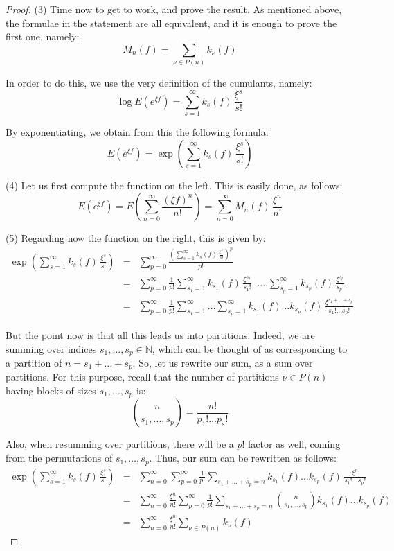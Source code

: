 \documentclass[12pt]{amsbook}
\begin{document}
\begin{proof}
(3) Time now to get to work, and prove the result. As mentioned above, the formulae in the statement are all equivalent, and it is enough to prove the first one, namely:
$$M_n(f)=\sum_{\nu\in P(n)}k_\nu(f)$$

In order to do this, we use the very definition of the cumulants, namely:
$$\log E(e^{\xi f})=\sum_{s=1}^\infty k_s(f)\,\frac{\xi^s}{s!}$$

By exponentiating, we obtain from this the following formula:
$$E(e^{\xi f})=\exp\left(\sum_{s=1}^\infty k_s(f)\,\frac{\xi^s}{s!}\right)$$

(4) Let us first compute the function on the left. This is easily done, as follows:
$$E(e^{\xi f})
=E\left(\sum_{n=0}^\infty\frac{(\xi f)^n}{n!}\right)
=\sum_{n=0}^\infty M_n(f)\,\frac{\xi^n}{n!}$$

(5) Regarding now the function on the right, this is given by:
\begin{eqnarray*}
\exp\left(\sum_{s=1}^\infty k_s(f)\,\frac{\xi^s}{s!}\right)
&=&\sum_{p=0}^\infty\frac{\left(\sum_{s=1}^\infty k_s(f)\,\frac{\xi^s}{s!}\right)^p}{p!}\\
&=&\sum_{p=0}^\infty\frac{1}{p!}\sum_{s_1=1}^\infty k_{s_1}(f)\,\frac{\xi^{s_1}}{s_1!}\ldots\ldots\sum_{s_p=1}^\infty k_{s_p}(f)\,\frac{\xi^{s_p}}{s_p!}\\
&=&\sum_{p=0}^\infty\frac{1}{p!}\sum_{s_1=1}^\infty\ldots\sum_{s_p=1}^\infty k_{s_1}(f)\ldots k_{s_p}(f)\,\frac{\xi^{s_1+\ldots+s_p}}{s_1!\ldots s_p!}
\end{eqnarray*}

But the point now is that all this leads us into partitions. Indeed, we are summing over indices $s_1,\ldots,s_p\in\mathbb N$, which can be thought of as corresponding to a partition of $n=s_1+\ldots+s_p$. So, let us rewrite our sum, as a sum over partitions. For this purpose, recall that the number of partitions $\nu\in P(n)$ having blocks of sizes $s_1,\ldots,s_p$ is:
$$\binom{n}{s_1,\ldots,s_p}=\frac{n!}{p_1!\ldots p_s!}$$

Also, when resumming over partitions, there will be a $p!$ factor as well, coming from the permutations of $s_1,\ldots,s_p$. Thus, our sum can be rewritten as follows:
\begin{eqnarray*}
\exp\left(\sum_{s=1}^\infty k_s(f)\,\frac{\xi^s}{s!}\right)
&=&\sum_{n=0}^\infty\sum_{p=0}^\infty\frac{1}{p!}\sum_{s_1+\ldots+s_p=n}k_{s_1}(f)\ldots k_{s_p}(f)\,\frac{\xi^n}{s_1!\ldots s_p!}\\
&=&\sum_{n=0}^\infty\frac{\xi^n}{n!}\sum_{p=0}^\infty\frac{1}{p!}\sum_{s_1+\ldots+s_p=n}\binom{n}{s_1,\ldots,s_p}k_{s_1}(f)\ldots k_{s_p}(f)\\
&=&\sum_{n=0}^\infty\frac{\xi^n}{n!}\sum_{\nu\in P(n)}k_\nu(f)
\end{eqnarray*}


\end{proof}
\end{document}
